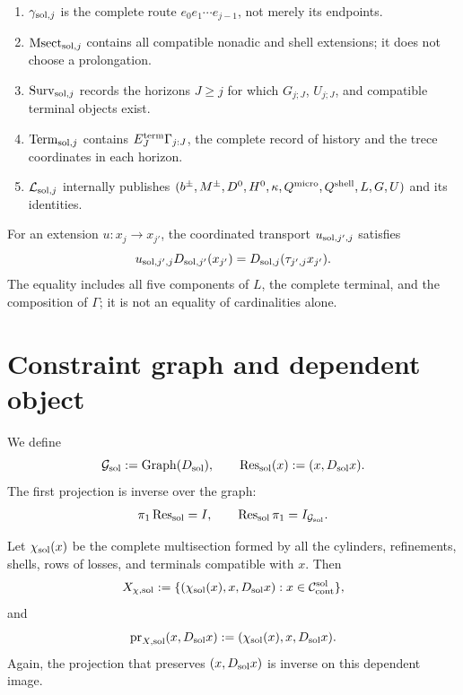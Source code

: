 \begin{enumerate}
       the increments \(b_j\), the row \(L_j\), and the Stein differences.
 \item \(\gamma_{{\rm sol},j}\) is the complete route \(e_0e_1\cdots e_{j-1}\), not merely
its endpoints.
 \item \(\operatorname{Msect}_{{\rm sol},j}\) contains all compatible
       nonadic and shell extensions; it does not choose a prolongation.
 \item \(\operatorname{Surv}_{{\rm sol},j}\) records the horizons
       \(J\geq j\) for which \(G_{j;J}\), \(U_{j;J}\), and
       compatible terminal objects exist.
 \item \(\operatorname{Term}_{{\rm sol},j}\) contains
       \(E_J^{\rm term}\Gamma_{j:J}\), the complete record of history and
       the trece coordinates in each horizon.
 \item \(\mathcal L_{{\rm sol},j}\) internally publishes
       \((b^\pm,M^\pm,D^0,H^0,\kappa,Q^{\rm micro},Q^{\rm shell},
       L,G,U)\) and its identities.
\end{enumerate}

For an extension \(u:x_j\to x_{j'}\), the coordinated transport
\(u_{{\rm sol},j',j}\) satisfies
\begin{equation}\label{eq:pdfv2-sol-naturality-d}
 u_{{\rm sol},j',j}D_{{\rm sol},j'}(x_{j'})
 =D_{{\rm sol},j}(\tau_{j',j}x_{j'}).
\end{equation}
The equality includes all five components of \(L\), the complete terminal, and
the composition of \(\Gamma\); it is not an equality of cardinalities alone.

\section{Constraint graph and dependent object}
\label{sec:pdfv2-sol-graphs}

We define
\begin{equation}\label{eq:pdfv2-sol-g-graph}
 \mathcal G_{\rm sol}:=\operatorname{Graph}(D_{\rm sol}),
 \qquad
 \operatorname{Res}_{\rm sol}(x):=(x,D_{\rm sol}x).
\end{equation}
The first projection is inverse over the graph:
\begin{equation}\label{eq:pdfv2-sol-res-inverse}
 \pi_1\operatorname{Res}_{\rm sol}=I,
 \qquad
 \operatorname{Res}_{\rm sol}\pi_1=I_{\mathcal G_{\rm sol}}.
\end{equation}

Let \(\chi_{\rm sol}(x)\) be the complete multisection formed by all the
cylinders, refinements, shells, rows of losses, and terminals compatible
with \(x\).  Then
\begin{equation}\label{eq:pdfv2-sol-xchi}
 X_{\chi,{\rm sol}}
 :=\{(\chi_{\rm sol}(x),x,D_{\rm sol}x):
 x\in\mathcal C_{\rm cont}^{\rm sol}\},
\end{equation}
and
\begin{equation}\label{eq:pdfv2-sol-prx}
 \operatorname{pr}_{X,{\rm sol}}(x,D_{\rm sol}x)
 :=(\chi_{\rm sol}(x),x,D_{\rm sol}x).
\end{equation}
Again, the projection that preserves \((x,D_{\rm sol}x)\) is inverse on
this dependent image.

